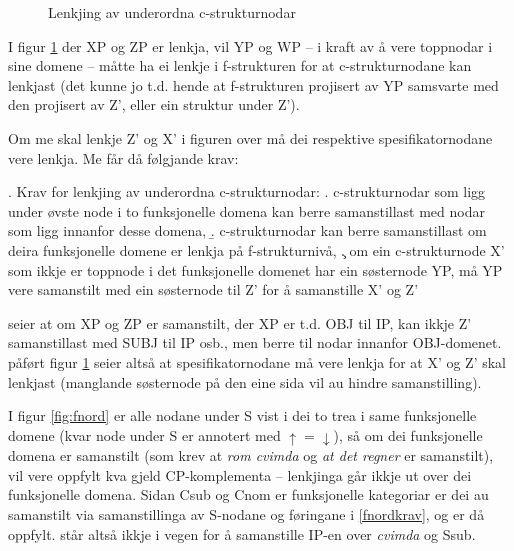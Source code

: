 \documentclass[11pt,a4paper,oneside,draft]{book}
\begin{document}
\begin{figure}[htp]
   \vfill{} %
   \caption{Lenkjing av underordna c-strukturnodar}
   \label{fig:subnode}
  \end{figure}

I figur \ref{fig:subnode} der XP og ZP er lenkja, vil YP og WP -- i
kraft av å vere toppnodar i sine domene -- måtte ha ei lenkje i
f-strukturen for at c-strukturnodane kan lenkjast (det kunne jo
t.d. hende at f-strukturen projisert av YP samsvarte med den projisert
av Z', eller ein struktur under Z').

Om me skal lenkje Z' og X' i figuren over må dei respektive
spesifikatornodane vere lenkja. Me får då følgjande krav:

\ex. \label{subnodekrav} Krav for lenkjing av underordna
c-strukturnodar:
\a. c-strukturnodar som ligg under øvste node i to funksjonelle
    domena kan berre samanstillast med nodar som ligg innanfor desse
    domena,
\b. c-strukturnodar kan berre samanstillast om deira funksjonelle
    domene er lenkja på f-strukturnivå,
\c. om ein c-strukturnode X' som ikkje er toppnode i det funksjonelle
    domenet har ein søsternode YP, må YP vere samanstilt med ein
    søsternode til Z' for å samanstille X' og Z'


\Last[a] seier at om XP og ZP er samanstilt, der XP er t.d. OBJ til
IP, kan ikkje Z' samanstillast med SUBJ til IP osb., men berre til
nodar innanfor OBJ-domenet. \Last[c] påført figur \ref{fig:subnode}
seier altså at spesifikatornodane må vere lenkja for at X' og Z' skal
lenkjast (manglande søsternode på den eine sida vil au hindre
samanstilling).

I figur \ref{fig:fnord} er alle nodane under S vist i dei to trea i
same funksjonelle domene (kvar node under S er annotert med $\uparrow
= \downarrow$), så om dei funksjonelle domena er samanstilt (som krev
at \emph{rom cvimda} og \emph{at det regner} er samanstilt), vil \Last[a og -b]
vere oppfylt kva gjeld CP-komplementa -- lenkjinga går ikkje ut over
dei funksjonelle domena. Sidan Csub og Cnom er funksjonelle kategoriar
er dei au samanstilt via samanstillinga av S-nodane og føringane i
\ref{fnordkrav}, og \Last[c] er då oppfylt. \Last står altså ikkje i
vegen for å samanstille IP-en over \emph{cvimda} og Ssub.
\end{document}
